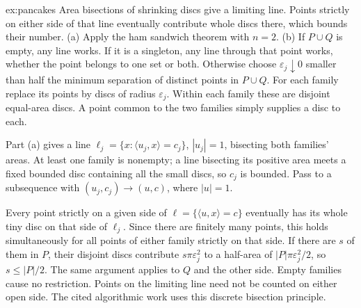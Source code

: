\begin{solution}{ex:pancakes}
\idea Area bisections of shrinking discs give a limiting line. Points strictly on either side of that line eventually contribute whole discs there, which bounds their number.
\writeup (a) Apply the ham sandwich theorem with $n=2$. (b) If $P\cup Q$ is empty, any line works. If it is a singleton, any line through that point works, whether the point belongs to one set or both. Otherwise choose $\varepsilon_j\downarrow0$ smaller than half the minimum separation of distinct points in $P\cup Q$. For each family replace its points by discs of radius $\varepsilon_j$. Within each family these are disjoint equal-area discs. A point common to the two families simply supplies a disc to each.

Part (a) gives a line $\ell_j=\{x:\langle u_j,x\rangle=c_j\}$, $|u_j|=1$, bisecting both families' areas. At least one family is nonempty; a line bisecting its positive area meets a fixed bounded disc containing all the small discs, so $c_j$ is bounded. Pass to a subsequence with $(u_j,c_j)\to(u,c)$, where $|u|=1$.

Every point strictly on a given side of $\ell=\{\langle u,x\rangle=c\}$ eventually has its whole tiny disc on that side of $\ell_j$. Since there are finitely many points, this holds simultaneously for all points of either family strictly on that side. If there are $s$ of them in $P$, their disjoint discs contribute $s\pi\varepsilon_j^2$ to a half-area of $|P|\pi\varepsilon_j^2/2$, so $s\le|P|/2$. The same argument applies to $Q$ and the other side. Empty families cause no restriction. Points on the limiting line need not be counted on either open side. The cited algorithmic work uses this discrete bisection principle.
\end{solution}


